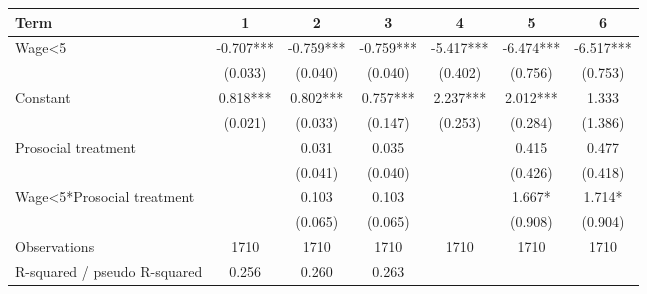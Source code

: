 \begin{tabular}{lcccccc}
\hline
Term & 1 & 2 & 3 & 4 & 5 & 6 \\
\hline
Wage<5 & -0.707*** & -0.759*** & -0.759*** & -5.417*** & -6.474*** & -6.517*** \\
 & (0.033) & (0.040) & (0.040) & (0.402) & (0.756) & (0.753) \\
Constant & 0.818*** & 0.802*** & 0.757*** & 2.237*** & 2.012*** & 1.333 \\
 & (0.021) & (0.033) & (0.147) & (0.253) & (0.284) & (1.386) \\
Prosocial treatment &  & 0.031 & 0.035 &  & 0.415 & 0.477 \\
 &  & (0.041) & (0.040) &  & (0.426) & (0.418) \\
Wage<5*Prosocial treatment &  & 0.103 & 0.103 &  & 1.667* & 1.714* \\
 &  & (0.065) & (0.065) &  & (0.908) & (0.904) \\
Observations & 1710 & 1710 & 1710 & 1710 & 1710 & 1710 \\
R-squared / pseudo R-squared & 0.256 & 0.260 & 0.263 &  &  &  \\
\hline
\end{tabular}
